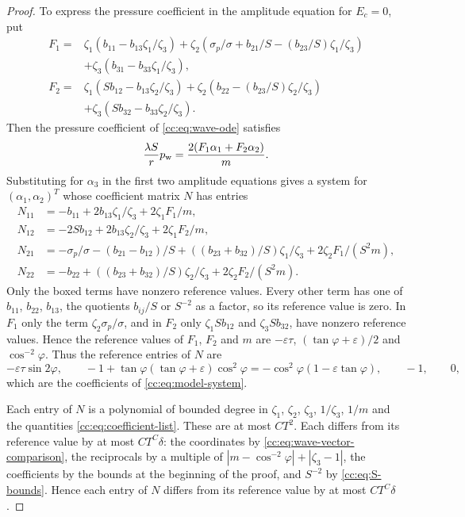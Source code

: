 \begin{proof}
To express the pressure coefficient in the amplitude equation for
$E_c=0$, put
\begin{align*}
 F_1={}&\zeta_1(b_{11}-b_{13}\zeta_1/\zeta_3)
       +\zeta_2(\sigma_p/\sigma+b_{21}/S-(b_{23}/S)\zeta_1/\zeta_3)\\
      &+\zeta_3(b_{31}-b_{33}\zeta_1/\zeta_3),\\
 F_2={}&\zeta_1(Sb_{12}-b_{13}\zeta_2/\zeta_3)
       +\zeta_2(b_{22}-(b_{23}/S)\zeta_2/\zeta_3)\\
      &+\zeta_3(Sb_{32}-b_{33}\zeta_2/\zeta_3).
\end{align*}
Then the pressure coefficient of \eqref{cc:eq:wave-ode} satisfies
\[
 \frac{\lambda S}{r}p_{\rm w}
   =\frac{2(F_1\alpha_1+F_2\alpha_2)}m.
\]
Substituting for $\alpha_3$ in the first two amplitude equations gives
a system for $(\alpha_1,\alpha_2)^T$ whose coefficient matrix $N$ has entries
\begin{align*}
 N_{11}&=-b_{11}+2b_{13}\zeta_1/\zeta_3+\boxed{2\zeta_1F_1/m},\\
 N_{12}&=\boxed{-2Sb_{12}}+2b_{13}\zeta_2/\zeta_3+\boxed{2\zeta_1F_2/m},\\
 N_{21}&=\boxed{-\sigma_p/\sigma}-(b_{21}-b_{12})/S
       +((b_{23}+b_{32})/S)\zeta_1/\zeta_3+2\zeta_2F_1/(S^2m),\\
 N_{22}&=-b_{22}+((b_{23}+b_{32})/S)\zeta_2/\zeta_3
                                      +2\zeta_2F_2/(S^2m).
\end{align*}
Only the boxed terms have nonzero reference values. Every other term
has one of $b_{11}$, $b_{22}$, $b_{13}$, the quotients $b_{ij}/S$ or
$S^{-2}$ as a factor, so its reference value is zero. In $F_1$ only
the term $\zeta_2\sigma_p/\sigma$, and in $F_2$ only $\zeta_1Sb_{12}$
and $\zeta_3Sb_{32}$, have nonzero reference values. Hence the
reference values of $F_1$, $F_2$ and $m$ are $-\varepsilon\tau$,
$(\tan\varphi+\varepsilon)/2$ and $\cos^{-2}\varphi$. Thus the
reference entries of $N$ are
\[
 -\varepsilon\tau\sin2\varphi,\qquad
 -1+\tan\varphi(\tan\varphi+\varepsilon)\cos^2\varphi
     =-\cos^2\varphi(1-\varepsilon\tan\varphi),\qquad -1,\qquad 0,
\]
which are the coefficients of \eqref{cc:eq:model-system}.

Each entry of $N$ is a polynomial of bounded degree in $\zeta_1$,
$\zeta_2$, $\zeta_3$, $1/\zeta_3$, $1/m$ and the quantities
\eqref{cc:eq:coefficient-list}. These are at most $CT^2$.
Each differs from its reference value by at most $CT^C\delta$: the
coordinates by \eqref{cc:eq:wave-vector-comparison}, the reciprocals
by a multiple of $|m-\cos^{-2}\varphi|+|\zeta_3-1|$, the
coefficients by the bounds at the beginning of the proof, and $S^{-2}$
by \eqref{cc:eq:S-bounds}. Hence each
entry of $N$ differs from its reference value by at most $CT^C\delta$.


\end{proof}
